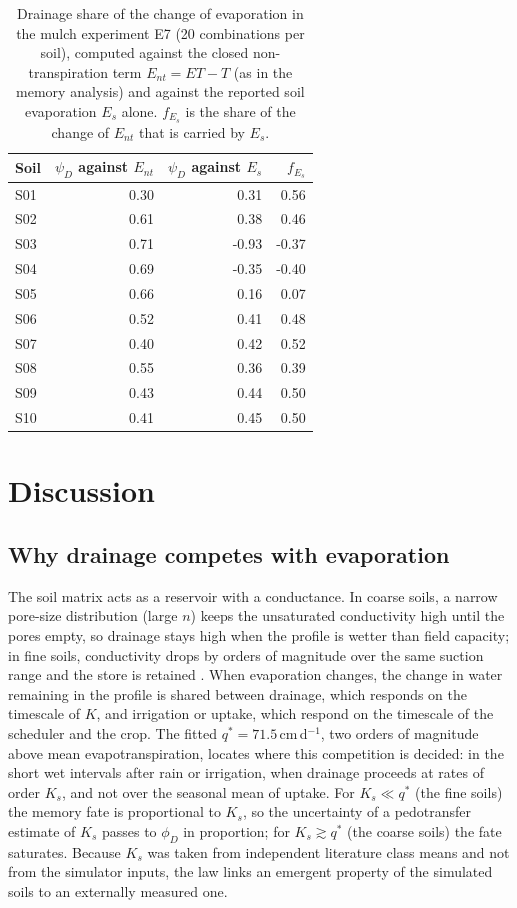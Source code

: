 \documentclass[review,12pt,authoryear]{elsarticle}
\begin{document}
\begin{table}[!htbp]\centering\small
\caption{Drainage share of the change of evaporation in the mulch experiment E7 (20 combinations per soil), computed against the closed non-transpiration term $E_{nt}=\mathit{ET}-T$ (as in the memory analysis) and against the reported soil evaporation $E_s$ alone. $f_{E_s}$ is the share of the change of $E_{nt}$ that is carried by $E_s$.}\label{tab:auditlink}
\begin{tabular}{lrrr}\toprule
Soil & $\psi_D$ against $E_{nt}$ & $\psi_D$ against $E_s$ & $f_{E_s}$\\\midrule
S01 & 0.30 & 0.31 & 0.56\\
S02 & 0.61 & 0.38 & 0.46\\
S03 & 0.71 & -0.93 & -0.37\\
S04 & 0.69 & -0.35 & -0.40\\
S05 & 0.66 & 0.16 & 0.07\\
S06 & 0.52 & 0.41 & 0.48\\
S07 & 0.40 & 0.42 & 0.52\\
S08 & 0.55 & 0.36 & 0.39\\
S09 & 0.43 & 0.44 & 0.50\\
S10 & 0.41 & 0.45 & 0.50\\
\bottomrule\end{tabular}\end{table}

\section{Discussion}
\label{sec:disc}
\subsection{Why drainage competes with evaporation}
The soil matrix acts as a reservoir with a conductance. In coarse soils, a narrow pore-size distribution (large $n$) keeps the unsaturated conductivity high until the pores empty, so drainage stays high when the profile is wetter than field capacity; in fine soils, conductivity drops by orders of magnitude over the same suction range and the store is retained \citep{Hillel1998,Brady2016}. When evaporation changes, the change in water remaining in the profile is shared between drainage, which responds on the timescale of $K$, and irrigation or uptake, which respond on the timescale of the scheduler and the crop. The fitted $q^\ast=71.5$\,cm\,d$^{-1}$, two orders of magnitude above mean evapotranspiration, locates where this competition is decided: in the short wet intervals after rain or irrigation, when drainage proceeds at rates of order $K_s$, and not over the seasonal mean of uptake. For $K_s\ll q^\ast$ (the fine soils) the memory fate is proportional to $K_s$, so the uncertainty of a pedotransfer estimate of $K_s$ passes to $\phi_D$ in proportion; for $K_s\gtrsim q^\ast$ (the coarse soils) the fate saturates. Because $K_s$ was taken from independent literature class means and not from the simulator inputs, the law links an emergent property of the simulated soils to an externally measured one.
\end{document}
